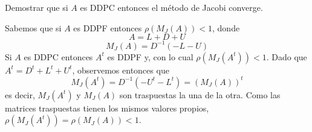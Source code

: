 \begin{ejer}
Demostrar que si $A$ es DDPC entonces el método de Jacobi converge.
\end{ejer}
\begin{sol}
Sabemos que si $A$ es DDPF entonces $\rho(M_J(A))<1$, donde
$$A=L+D+U$$
$$M_J(A)=D^{-1}(-L-U)$$
Si $A$ es DDPC entonces $A^t$ es DDPF y, con lo cual $\rho(M_J(A^t))<1$. Dado que $A^t=D^t +L^t + U^t$, observemos entonces que
$$M_J(A^t)=D^{-1}(-U^t-L^t)=(M_J(A))^t$$
es decir, $M_J(A^t)$ y $M_J(A)$ son traspuestas la una de la otra. Como las matrices traspuestas tienen los mismos valores propios, $\rho(M_J(A^t))=\rho(M_J(A))<1$.
\end{sol}
